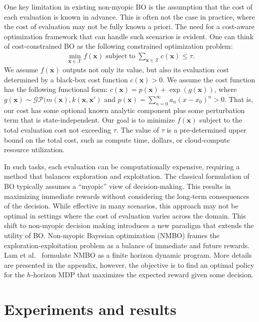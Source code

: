 \documentclass{article}
\newcommand{\bfx}{\textbf{x}}
\begin{document}
One key limitation in existing non-myopic BO is the 
assumption that the cost of each evaluation is known in advance. 
This is often not the case in practice, where the cost of 
evaluation may not be fully known a priori. The need for a cost-aware optimization framework that can handle such scenarios is 
evident. One can think of cost-constrained BO as the following constrained optimization problem:
\begin{align*}
\min_{\bfx \in \mathcal{X}} f(\bfx)
\operatorname{subject \; to} \sum_{\bfx \in \mathcal{X}} c(\bfx)
\leq \tau.
\end{align*}
We assume $f(\bfx)$ outputs not only its value, but also its evaluation cost determined by a 
black-box cost function $c(\bfx) > 0$. We assume the cost function has the following functional
form: $c(\bfx) = p(\bfx) + \exp(g(\bfx))$, where $g(\bfx) \sim \mathcal{GP}(m(\bfx), k(\bfx, \bfx')$ and $p(\bfx) = 
\sum_{n=0}^{\infty} a_n(x - x_0)^n > 0$. That is, our cost has some 
optional known analytic component plus some perturbation term 
that is state-independent.
Our goal is to minimize $f(\bfx)$ subject to the total evaluation cost not exceeding $\tau$. The value of
$\tau$ is a pre-determined upper bound on the total cost, such as compute time, dollars, or
cloud-compute resource utilization.


In such tasks, each evaluation can be 
computationally expensive, requiring a method that balances 
exploration and exploitation.
The classical formulation of BO typically assumes a ``myopic'' 
view of decision-making. This results in maximizing immediate 
rewards without considering the long-term consequences of the 
decision. While effective in many scenarios, this approach may 
not be optimal in settings where the cost of evaluation varies 
across the domain. This shift to non-myopic decision making 
introduces a new paradigm that extends the utility of BO.
Non-myopic Bayesian optimization (NMBO) frames the exploration-exploitation problem as a balance of immediate and future 
rewards. Lam et al.~\cite{Lam2016} formulate NMBO as a finite 
horizon dynamic program. More details are presented in the appendix, however, the objective is to find an optimal policy
for the $h$-horizon MDP that maximizes the expected reward
given some decision.

\section{Experiments and results}
\end{document}
